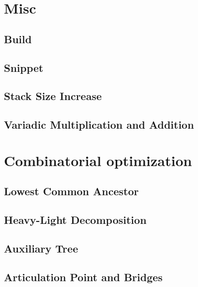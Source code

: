 \section{Misc}
\subsection{Build}
\raggedbottom
\hrulefill
\subsection{Snippet}
\raggedbottom
\hrulefill
\subsection{Stack Size Increase}
\raggedbottom
\hrulefill
\subsection{Variadic Multiplication and Addition}
\raggedbottom
\hrulefill

\section{Combinatorial optimization}
\subsection{Lowest Common Ancestor}
\raggedbottom
\hrulefill
\subsection{Heavy-Light Decomposition}
\raggedbottom
\hrulefill
\subsection{Auxiliary Tree}
\raggedbottom
\hrulefill
\subsection{Articulation Point and Bridges}
\raggedbottom
\hrulefill
